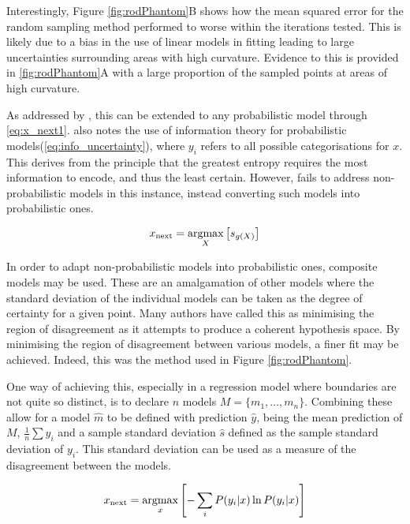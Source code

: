 Interestingly, Figure \ref{fig:rodPhantom}B shows how the mean squared error for the random sampling method performed to worse within the iterations tested. This is likely due to a bias in the use of linear models in fitting leading to large uncertainties surrounding areas with high curvature. Evidence to this is provided in \ref{fig:rodPhantom}A with a large proportion of the sampled points at areas of high curvature.

As addressed by \textcite{Set09}, this can be extended to any probabilistic model through \ref{eq:x_next1}. \textcite{Set09} also notes the use of information theory for probabilistic models(\ref{eq:info_uncertainty}), where $y_i$ refers to all possible categorisations for $x$. This derives from the principle that the greatest entropy requires the most information to encode, and thus the least certain. However, \textcite{Set09} fails to address non-probabilistic models in this instance, instead converting such models into probabilistic ones.

\begin{equation}
  \label{eq:x_next1}
  x_\mathrm{next}=\operatorname*{argmax}_X{\left[s_{g(X)}\right]}
\end{equation}

In order to adapt non-probabilistic models into probabilistic ones, composite models may be used. These are an amalgamation of other models where the standard deviation of the individual models can be taken as the degree of certainty for a given point. Many authors have called this as minimising the region of disagreement as it attempts to produce a coherent hypothesis space. By minimising the region of disagreement between various models, a finer fit may be achieved. Indeed, this was the method used in Figure \ref{fig:rodPhantom}.

One way of achieving this, especially in a regression model where boundaries are not quite so distinct, is to declare $n$ models ${M = \{m_1,\ldots{}, m_n\}}$. Combining these allow for a model $\hat{m}$ to be defined with prediction $\hat{y}$, being the mean prediction of $M$, ${\frac{1}{n}\sum{y_i}}$ and a sample standard deviation $\hat{s}$ defined as the sample standard deviation of $y_i$. This standard deviation can be used as a measure of the disagreement between the models.

\begin{equation}
  \label{eq:info_uncertainty}
  x_\mathrm{next}=\operatorname*{argmax}_x{\left[-\sum_i{P(y_i|x)\ln{P(y_i|x)}}\right]}
\end{equation}

